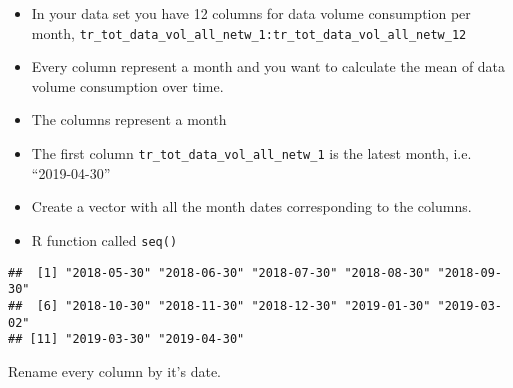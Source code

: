 \documentclass[]{book}
\newenvironment{Shaded}{\begin{snugshade}}{\end{snugshade}}
\newcommand{\DataTypeTok}[1]{\textcolor[rgb]{0.13,0.29,0.53}{#1}}
\newcommand{\DecValTok}[1]{\textcolor[rgb]{0.00,0.00,0.81}{#1}}
\newcommand{\KeywordTok}[1]{\textcolor[rgb]{0.13,0.29,0.53}{\textbf{#1}}}
\newcommand{\NormalTok}[1]{#1}
\newcommand{\OperatorTok}[1]{\textcolor[rgb]{0.81,0.36,0.00}{\textbf{#1}}}
\newcommand{\StringTok}[1]{\textcolor[rgb]{0.31,0.60,0.02}{#1}}
\begin{document}
\begin{itemize}
\item
  In your data set you have 12 columns for data volume consumption per month, \texttt{tr\_tot\_data\_vol\_all\_netw\_1:tr\_tot\_data\_vol\_all\_netw\_12}
\item
  Every column represent a month and you want to calculate the mean of data volume consumption over time.
\item
  The columns represent a month
\item
  The first column \texttt{tr\_tot\_data\_vol\_all\_netw\_1} is the latest month, i.e. ``2019-04-30''
\item
  Create a vector with all the month dates corresponding to the columns.
\item
  R function called \texttt{seq()}
\end{itemize}

\begin{Shaded}
\end{Shaded}

\begin{verbatim}
##  [1] "2018-05-30" "2018-06-30" "2018-07-30" "2018-08-30" "2018-09-30"
##  [6] "2018-10-30" "2018-11-30" "2018-12-30" "2019-01-30" "2019-03-02"
## [11] "2019-03-30" "2019-04-30"
\end{verbatim}

Rename every column by it's date.

\begin{Shaded}
\end{Shaded}
\end{document}
